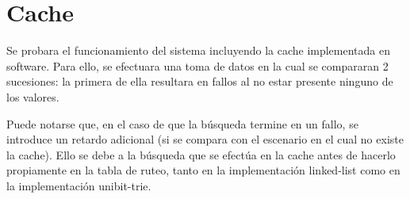\newpage
\section{Cache}

Se probara el funcionamiento del sistema incluyendo la cache implementada en software. Para ello, se efectuara una toma de datos en la cual se compararan 2 sucesiones: la primera de ella resultara en fallos al no estar presente ninguno de los valores.

Puede notarse que, en el caso de que la búsqueda termine en un fallo, se introduce un retardo adicional (si se compara con el escenario en el cual no existe la cache). Ello se debe a la búsqueda que se efectúa en la cache antes de hacerlo propiamente en la tabla de ruteo, tanto en la implementación linked-list como en la implementación unibit-trie.


